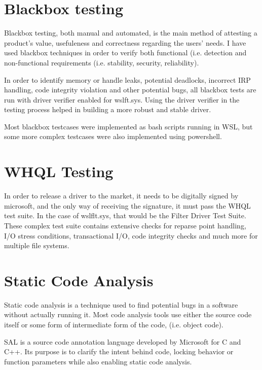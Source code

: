     \pagebreak

    \section{Blackbox testing}
        Blackbox testing, both manual and automated, is the main method of attesting a product's value, usefuleness and correctness regarding
        the users' needs. I have used blackbox techniques in order to verify both functional (i.e. detection and non-functional requirements
        (i.e. stability, security, reliability).

        In order to identify memory or handle leaks, potential deadlocks, incorrect IRP handling, code integrity violation and other potential
        bugs, all blackbox tests are run with driver verifier enabled for wslft.sys. Using the driver verifier in the testing process helped
        in building a more robust and stable driver.

        Most blackbox testcases were implemented as bash scripts running in WSL, but some more complex testcases were also implemented
        using powershell.

    \section{WHQL Testing}
        In order to release a driver to the market, it needs to be digitally signed by microsoft, and the only way of receiving the signature, it
        must pass the WHQL test suite. In the case of wslflt.sys, that would be the Filter Driver Test Suite. These complex test suite
        contains extensive checks for reparse point handling, I/O stress conditions, transactional I/O, code integrity checks and much more for
        multiple file systems.

    \section{Static Code Analysis}
        Static code analysis is a technique used to find potential bugs in a software without actually running it. Most code analysis tools use
        either the source code itself or some form of intermediate form of the code, (i.e. object code).

        SAL is a source code annotation language developed by Microsoft for C and C++. Its purpose is to clarify the intent behind code, locking
        behavior or function parameters while also enabling static code analysis.

